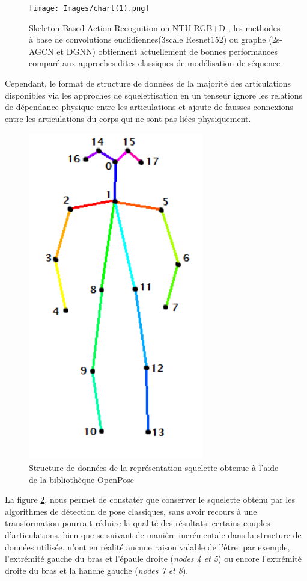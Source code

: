 \begin{figure}[H]
    \centering
    \texttt{[image: Images/chart(1).png]}
    \caption{Skeleton Based Action Recognition on NTU RGB+D \cite{shahroudy2016ntu}, les methodes à base de convolutions euclidiennes(3scale Resnet152) ou graphe (2s-AGCN et DGNN) obtiennent actuellement de bonnes performances comparé aux approches dites classiques de modélisation de séquence}
    \label{fig:skeltoppp}
\end{figure}

Cependant, le format de structure de données de la majorité des articulations disponibles via les approches de squelettisation en un tenseur ignore les relations de dépendance physique entre les articulations et ajoute de fausses connexions entre les articulations du corps qui ne sont pas liées physiquement.

\begin{figure}[H]
    \centering
    \includegraphics[width=0.3\linewidth]{Images/openpose.png}
    \caption{Structure de données de la représentation squelette obtenue à l'aide de la bibliothèque OpenPose \cite{cao2017realtime}}
    \label{fig:openPoseSkel}
\end{figure}

La figure \ref{fig:openPoseSkel}, nous permet de constater que conserver le squelette obtenu par les algorithmes de détection de pose classiques, sans avoir recours à une transformation pourrait réduire la qualité des résultats: certains couples d'articulations, bien que se suivant de manière incrémentale dans la structure de données utilisée, n'ont en réalité aucune raison valable de l'être: par exemple, l'extrémité gauche du bras et l'épaule droite (\textit{nodes 4 et 5}) ou encore l'extrémité droite du bras et la hanche gauche (\textit{nodes 7 et 8}).\\

